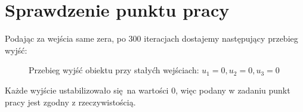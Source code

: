 \chapter{Sprawdzenie punktu pracy}

Podając za wejścia same zera, po 300 iteracjach dostajemy następujący przebieg wyjść:

\begin{figure}[H]
\centering

\caption{Przebieg wyjść obiektu przy stałyćh wejściach: $u_1 = 0, u_2 = 0, u_3 = 0$}
\end{figure}

Każde wyjście ustabilizowało się na wartości 0, więc podany w zadaniu punkt pracy jest zgodny z rzeczywistością.